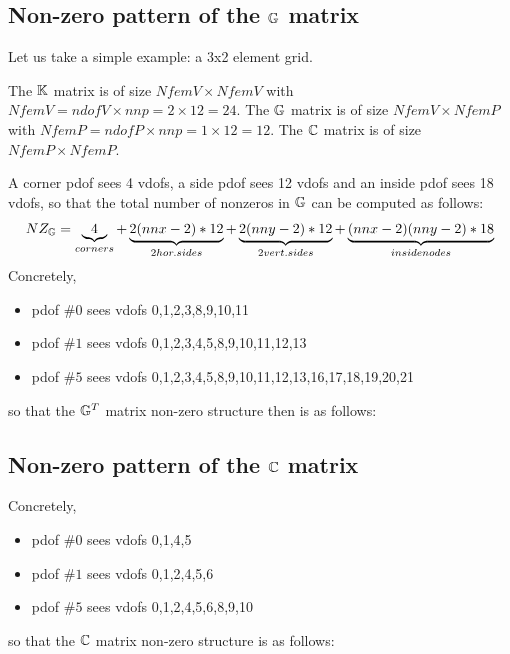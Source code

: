 \subsection*{Non-zero pattern of the ${\mathbb{G}}$ matrix} 

Let us take a simple example: a 3x2 element grid.



The ${\mathbb{K}}$ matrix is of size $NfemV \times NfemV$ with $NfemV=ndofV \times nnp = 2\times 12=24$.
The ${\mathbb{G}}$ matrix is of size $NfemV \times NfemP$ with $NfemP=ndofP \times nnp = 1\times 12=12$.
The ${\mathbb{C}}$ matrix is of size $NfemP \times NfemP$. 

A corner pdof sees 4 vdofs, a side pdof sees 12 vdofs and an inside pdof sees 18 vdofs, so that 
the total number of nonzeros in ${\mathbb{G}}$ can be computed as follows:
\[
NZ_{\mathbb{G}} = \underbrace{4}_{corners} + 
\underbrace{2(nnx-2)*12}_{2 hor. sides} 
+ 
\underbrace{2(nny-2)*12}_{2 vert. sides} 
+ 
\underbrace{(nnx-2)(nny-2)*18}_{inside nodes}
\]
Concretely, 
\begin{itemize}
\item pdof $\#0$ sees vdofs 0,1,2,3,8,9,10,11
\item pdof $\#1$ sees vdofs 0,1,2,3,4,5,8,9,10,11,12,13
\item pdof $\#5$ sees vdofs 0,1,2,3,4,5,8,9,10,11,12,13,16,17,18,19,20,21
\end{itemize}
so that the ${\mathbb{G}}^T$ matrix non-zero structure then is as follows:








\subsection*{Non-zero pattern of the ${\mathbb{C}}$ matrix}

Concretely, 
\begin{itemize}
\item pdof $\#0$ sees vdofs 0,1,4,5
\item pdof $\#1$ sees vdofs 0,1,2,4,5,6
\item pdof $\#5$ sees vdofs 0,1,2,4,5,6,8,9,10
\end{itemize}
so that the ${\mathbb{C}}$ matrix non-zero structure is as follows:

